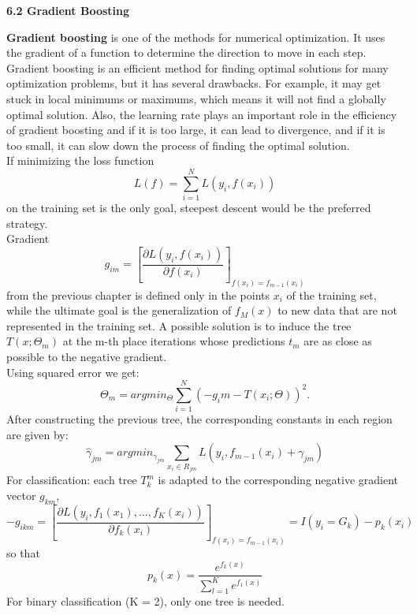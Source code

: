 \documentclass[12pt, letterpaper, twoside]{article}
\begin{document}
\begin{center}
\textbf{\large{6.2 Gradient Boosting}}
\end{center}
\hspace*{4ex} \textbf{Gradient boosting} is one of the methods for numerical optimization. It uses the gradient of a function to determine the direction to move in each step.\\ 
\hspace*{4ex}Gradient boosting is an efficient method for finding optimal solutions for many optimization problems, but it has several drawbacks. For example, it may get stuck in local minimums or maximums, which means it will not find a globally optimal solution. Also, the learning rate plays an important role in the efficiency of gradient boosting and if it is too large, it can lead to divergence, and if it is too small, it can slow down the process of finding the optimal solution.\\
\hspace*{4ex}If minimizing the loss function
\begin{equation*}
L(f)=\sum_{i=1}^N L(y_i,f(x_i))
\end{equation*}
on the training set is the only goal, steepest descent would be the preferred strategy.\\
\hspace*{4ex}Gradient
\begin{equation*}
g_{im}=[\frac{\partial L(y_i,f(x_i))}{\partial f(x_i)}]_ {f(x_i)=f_{m-1}(x_i)}
\end{equation*}
from the previous chapter is defined only in the points $x_i$ of the training set, while the ultimate goal is the generalization of $f_M(x)$ to new data that are not represented in the training set. A possible solution is to induce the tree $T(x;\Theta_m)$ at the m-th place
iterations whose predictions $t_m$ are as close as possible to the negative gradient.\\
\hspace*{4ex} Using squared error we get:
\begin{equation*}
\Theta_m=argmin_{\Theta}\sum_{i=1}^N (-g_i m-T(x_i;\Theta))^2.
\end{equation*}
After constructing the previous tree, the corresponding constants in each region are given by:
\begin{equation*}
\hat{\gamma}_{jm}=argmin_{\gamma_{jm}}\sum_{x_i \in R_{jm}}L(y_i,f_{m-1}(x_i)+\gamma_{jm})
\end{equation*}
For classification: each tree $T_k^m$ is adapted to the corresponding negative gradient vector $g_{km}$,
\begin{equation*}
-g_{ikm}=[\frac{\partial L(y_i,f_1(x_1),...,f_K(x_i))}{\partial f_k(x_i)}]_{f(x_i)=f_{m-1}(x_i)}=I(y_i=G_k)-p_k(x_i)
\end{equation*}
so that
\begin{equation*}
p_k(x)=\frac{e^{f_k(x)}}{\sum_{l=1}^K e^{f_1 (x)}}
\end{equation*}
For binary classification (K = 2), only one tree is needed.
\end{document}
